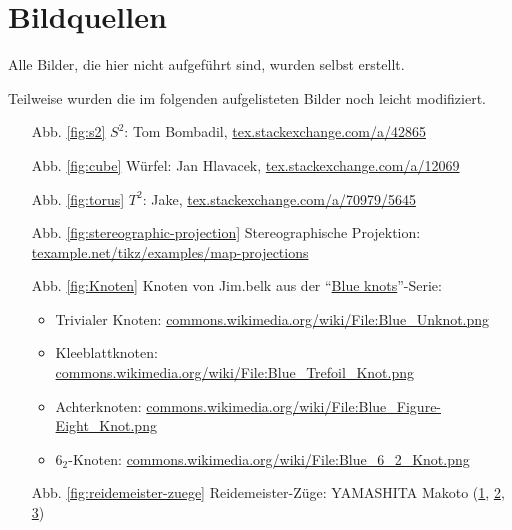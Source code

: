 \chapter*{Bildquellen}

Alle Bilder, die hier nicht aufgeführt sind, wurden selbst erstellt.

Teilweise wurden die im folgenden aufgelisteten Bilder noch leicht
modifiziert.

\begin{itemize}
    \item[Abb. \ref{fig:s2}] $S^2$: Tom Bombadil, \href{http://tex.stackexchange.com/a/42865/5645}{tex.stackexchange.com/a/42865}
    \item[Abb. \ref{fig:cube}] Würfel: Jan Hlavacek, \href{http://tex.stackexchange.com/a/12069/5645}{tex.stackexchange.com/a/12069}
    \item[Abb. \ref{fig:torus}] $T^2$: Jake, \href{http://tex.stackexchange.com/a/70979/5645}{tex.stackexchange.com/a/70979/5645}
    \item[Abb. \ref{fig:stereographic-projection}] Stereographische Projektion: \href{http://texample.net/tikz/examples/map-projections/}{texample.net/tikz/examples/map-projections}
    \item[Abb. \ref{fig:Knoten}] Knoten von Jim.belk aus der \enquote{\href{https://commons.wikimedia.org/wiki/Category:Blue_knots}{Blue knots}}-Serie:
        \begin{itemize}
            \item Trivialer Knoten: \href{https://commons.wikimedia.org/wiki/File:Blue_Unknot.png}{commons.wikimedia.org/wiki/File:Blue\_Unknot.png}
            \item Kleeblattknoten: \href{https://commons.wikimedia.org/wiki/File:Blue_Trefoil_Knot.png}{commons.wikimedia.org/wiki/File:Blue\_Trefoil\_Knot.png}
            \item Achterknoten: \href{https://commons.wikimedia.org/wiki/File:Blue_Figure-Eight_Knot.png}{commons.wikimedia.org/wiki/File:Blue\_Figure-Eight\_Knot.png}
            \item $6_2$-Knoten: \href{https://commons.wikimedia.org/wiki/File:Blue_6_2_Knot.png}{commons.wikimedia.org/wiki/File:Blue\_6\_2\_Knot.png}
        \end{itemize}
    \item[Abb. \ref{fig:reidemeister-zuege}] Reidemeister-Züge: YAMASHITA Makoto (\href{https://commons.wikimedia.org/wiki/File:Reidemeister_move_1.png}{1}, \href{https://commons.wikimedia.org/wiki/File:Reidemeister_move_1.png}{2}, \href{https://commons.wikimedia.org/wiki/File:Reidemeister_move_1.png}{3})

\end{itemize}

